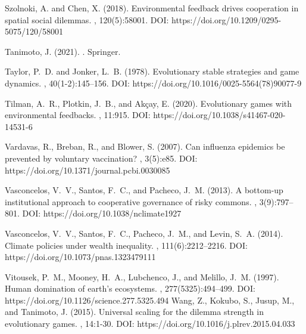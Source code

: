 \documentclass[9pt]{elife}
\begin{document}
\begin{thebibliography}{}
Szolnoki, A. and Chen, X. (2018).
\newblock Environmental feedback drives cooperation in spatial social dilemmas.
, 120(5):58001. DOI: https://doi.org/10.1209/0295-5075/120/58001

Tanimoto, J. (2021).
.
\newblock Springer.




Taylor, P.~D. and Jonker, L.~B. (1978).
\newblock Evolutionary stable strategies and game dynamics.
, 40(1-2):145--156. DOI: https://doi.org/10.1016/0025-5564(78)90077-9

Tilman, A.~R., Plotkin, J.~B., and Ak{\c{c}}ay, E. (2020).
\newblock Evolutionary games with environmental feedbacks.
, 11:915. DOI: https://doi.org/10.1038/s41467-020-14531-6

Vardavas, R., Breban, R., and Blower, S. (2007).
\newblock Can influenza epidemics be prevented by voluntary vaccination?
, 3(5):e85. DOI: https://doi.org/10.1371/journal.pcbi.0030085

Vasconcelos, V.~V., Santos, F.~C., and Pacheco, J.~M. (2013).
\newblock A bottom-up institutional approach to cooperative governance of risky
  commons.
, 3(9):797--801. DOI: https://doi.org/10.1038/nclimate1927

Vasconcelos, V.~V., Santos, F.~C., Pacheco, J.~M., and Levin, S.~A. (2014).
\newblock Climate policies under wealth inequality.
, 111(6):2212--2216. DOI: https://doi.org/10.1073/pnas.1323479111

Vitousek, P.~M., Mooney, H.~A., Lubchenco, J., and Melillo, J.~M. (1997).
\newblock Human domination of earth's ecosystems.
, 277(5325):494--499. DOI: https://doi.org/10.1126/science.277.5325.494
Wang, Z., Kokubo, S., Jusup, M., and Tanimoto, J. (2015). 
\newblock Universal scaling for the dilemma strength in evolutionary games. 
, 14:1-30. DOI: https://doi.org/10.1016/j.plrev.2015.04.033


\end{thebibliography}
\end{document}
